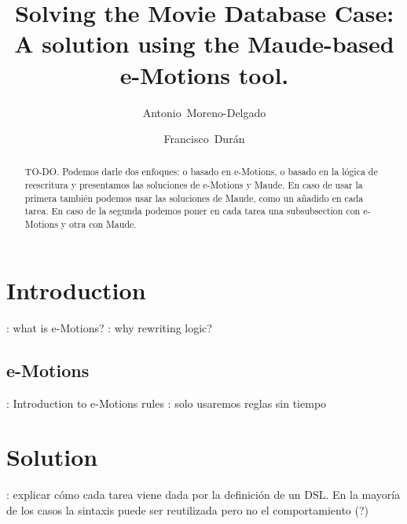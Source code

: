\documentclass[draft]{llncs}
\newcommand{\todo}[1]{\textbf{\color{red}{TO-DO}}: #1}
\newcommand{\todo}[1]{}
\begin{document}
\pagestyle{headings} %

\title{Solving the Movie Database Case: A solution using the Maude-based e-Motions tool.}

\author{Antonio~Moreno-Delgado \and Francisco~Dur\'an}



\maketitle

\begin{abstract}
TO-DO. Podemos darle dos enfoques: o basado en e-Motions, o basado en la lógica de reescritura y presentamos las soluciones de e-Motions y Maude. En caso de usar la primera también podemos usar las soluciones de Maude, como un añadido en cada tarea. En caso de la segunda podemos poner en cada tarea una subsubsection con e-Motions y otra con Maude.
\end{abstract}

\section{Introduction}\label{sec:intro}

\todo{what is e-Motions?}
\todo{why rewriting logic?}

\subsection{e-Motions}\label{sub:emotions}
\todo{Introduction to e-Motions rules}
\todo{solo usaremos reglas sin tiempo}
\section{Solution}\label{sec:solution}
\todo{explicar cómo cada tarea viene dada por la definición de un DSL. En la mayoría de los casos la sintaxis puede ser reutilizada pero no el comportamiento (?)}
\end{document}
